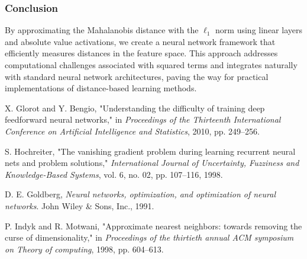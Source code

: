 \subsubsection{Conclusion}

By approximating the Mahalanobis distance with the $\ell_1$ norm using linear layers and absolute value activations, we create a neural network framework that efficiently measures distances in the feature space. This approach addresses computational challenges associated with squared terms and integrates naturally with standard neural network architectures, paving the way for practical implementations of distance-based learning methods.

\begin{thebibliography}{9}  X. Glorot and Y. Bengio, "Understanding the difficulty of training deep feedforward neural networks," in \textit{Proceedings of the Thirteenth International Conference on Artificial Intelligence and Statistics}, 2010, pp. 249–256.

 S. Hochreiter, "The vanishing gradient problem during learning recurrent neural nets and problem solutions," \textit{International Journal of Uncertainty, Fuzziness and Knowledge-Based Systems}, vol. 6, no. 02, pp. 107–116, 1998.

 D. E. Goldberg, \textit{Neural networks, optimization, and optimization of neural networks}. John Wiley & Sons, Inc., 1991.

 P. Indyk and R. Motwani, "Approximate nearest neighbors: towards removing the curse of dimensionality," in \textit{Proceedings of the thirtieth annual ACM symposium on Theory of computing}, 1998, pp. 604–613. \end{thebibliography}